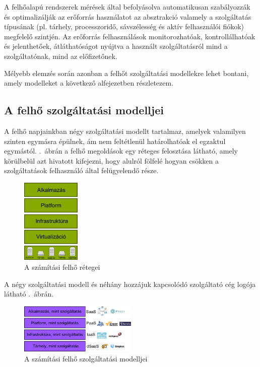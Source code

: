 A felhőalapú rendszerek mérések által befolyásolva automatikusan szabályozzák és optimalizálják az erőforrás használatot az absztrakció valamely a szolgáltatás típusának (pl. tárhely, processzoridő, sávszélesség és aktív felhasználói fiókok) megfelelő szintjén. Az erőforrás felhasználások monitorozhatóak, kontrollálhatóak és jelenthetőek, átláthatóságot nyújtva a használt szolgáltatásról mind a szolgáltatónak, mind az előfizetőnek.

Mélyebb elemzés során azonban a felhőt szolgáltatási modellekre lehet bontani, amely modelleket a következő alfejezetben részletezem.

\subsection{A felhő szolgáltatási modelljei}

A felhő napjainkban négy szolgáltatási modellt tartalmaz, amelyek valamilyen szinten egymásra épülnek, ám nem feltétlenül határolhatóak el egzaktul egymástól. .~ábrán a felhő megoldások egy réteges felosztása látható, amely körülbelül azt hivatott kifejezni, hogy alulról fölfelé hogyan csökken a szolgáltatások felhasználó által felügyelendő része.


\begin{figure}[h!]
\centering
\includegraphics[width=0.25\textwidth]{figures/cloud_retegek.png}
\caption{A számítási felhő rétegei \label{fig:cloud_retegek}}
\end{figure}

A négy szolgáltatási modell és néhány hozzájuk kapcsolódó szolgáltató cég logója látható .~ábrán.

\begin{figure}[h!]
\centering
\includegraphics[width=0.5\textwidth]{figures/cloud_service_models.png}
\caption{A számítási felhő szolgáltatási modelljei \label{fig:cloud_service_models}}
\end{figure}
 
